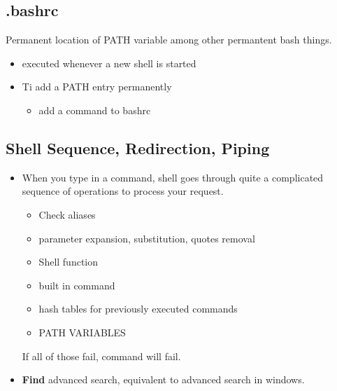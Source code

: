 \documentclass{article}
\begin{document}
\subsection*{.bashrc}
Permanent location of PATH variable among other permantent bash things.
\begin{itemize}
  \item executed whenever a new shell is started
  \item Ti add a PATH entry permanently
  \begin{itemize}
    \item add a command to bashrc
  \end{itemize}
\end{itemize}
\subsection{Shell Sequence, Redirection, Piping}
\begin{itemize}
  \item When you type in a command, shell goes through quite a complicated sequence of operations to process your request.
  \begin{itemize}
    \item Check aliases
    \item parameter expansion, substitution, quotes removal
    \item Shell function
    \item built in command
    \item hash tables for previously executed commands
    \item PATH VARIABLES
  \end{itemize}
  If all of those fail, command will fail.
  \item \textbf{Find} advanced search, equivalent to advanced search in windows.
\end{itemize}
\end{document}
